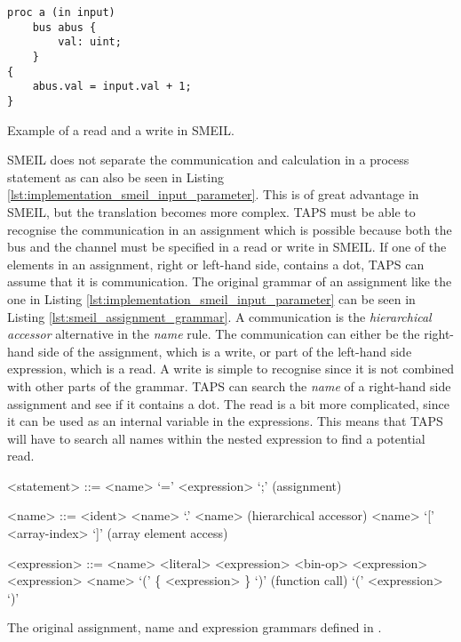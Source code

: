 \begin{listing}
\begin{verbatim}
proc a (in input)
    bus abus {
        val: uint;
    }
{
    abus.val = input.val + 1;
}
\end{verbatim}
\caption{Example of a read and a write in SMEIL.}
\label{lst:implementation_smeil_input_parameter}
\end{listing}
SMEIL does not separate the communication and calculation in a process statement as can also be seen in Listing \ref{lst:implementation_smeil_input_parameter}. This is of great advantage in SMEIL, but the translation becomes more complex.
TAPS must be able to recognise the communication in an assignment which is possible because both the bus and the channel must be specified in a read or write in SMEIL. If one of the elements in an assignment, right or left-hand side, contains a dot, TAPS can assume that it is communication. The original grammar of an assignment like the one in Listing \ref{lst:implementation_smeil_input_parameter} can be seen in Listing \ref{lst:smeil_assignment_grammar}. A communication is the \textit{hierarchical accessor} alternative in the \textit{name} rule. The communication can either be the right-hand side of the assignment, which is a write, or part of the left-hand side expression, which is a read. A write is simple to recognise since it is not combined with other parts of the grammar. TAPS can search the \textit{name} of a right-hand side assignment and see if it contains a dot. The read is a bit more complicated, since it can be used as an internal variable in the expressions. This means that TAPS will have to search all names within the nested expression to find a potential read.
\begin{listing}
\begin{grammar}
<statement> ::= <name> `=' <expression> `;' (assignment)

<name> ::= <ident>
\alt <name> `.' <name> (hierarchical accessor)
\alt <name> `[' <array-index> `]' (array element access)

<expression> ::= <name>
\alt <literal>
\alt <expression> <bin-op> <expression>
 <expression>
\alt <name> `(' \{ <expression> \}  `)' (function call)
\alt `(' <expression> `)'


\end{grammar}
\caption{The original assignment, name and expression grammars defined in \cite{Asheim2018}.}
\label{lst:smeil_assignment_grammar}
\end{listing}
